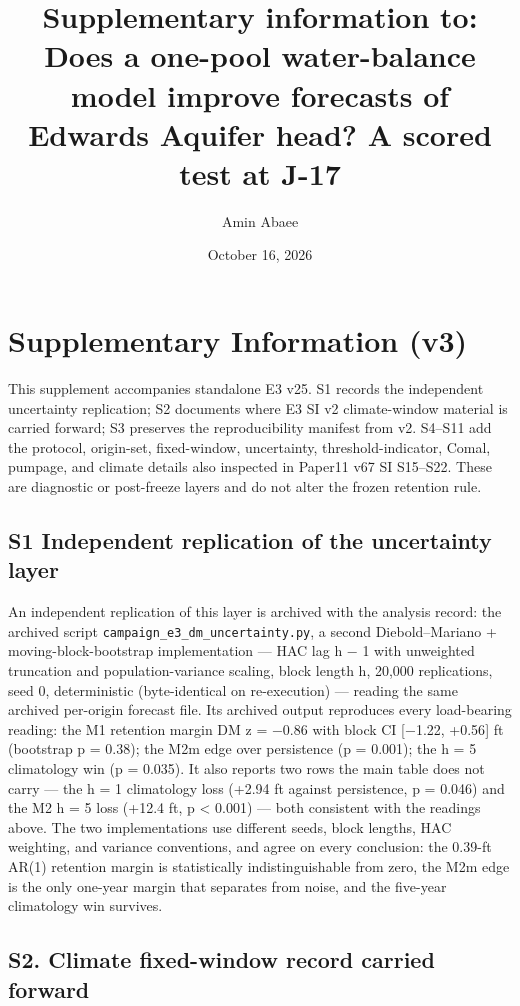 \documentclass[11pt]{article}
\title{Supplementary information to: Does a one-pool water-balance model improve forecasts of Edwards Aquifer head? A scored test at J-17}
\author{Amin Abaee}
\date{October 16, 2026}
\begin{document}
\maketitle

\section*{Supplementary Information (v3)}

This supplement accompanies standalone E3 v25. S1 records the independent uncertainty replication; S2 documents where E3 SI v2 climate-window material is carried forward; S3 preserves the reproducibility manifest from v2. S4--S11 add the protocol, origin-set, fixed-window, uncertainty, threshold-indicator, Comal, pumpage, and climate details also inspected in Paper11 v67 SI S15--S22. These are diagnostic or post-freeze layers and do not alter the frozen retention rule.

\subsection{S1 Independent replication of the uncertainty
layer}\label{s1-independent-replication-of-the-uncertainty-layer}

An independent replication of this layer is archived with the
analysis record: the archived script
\texttt{campaign\_e3\_dm\_uncertainty.py}, a second Diebold--Mariano +
moving-block-bootstrap implementation --- HAC lag h − 1 with unweighted
truncation and population-variance scaling, block length h, 20,000
replications, seed 0, deterministic (byte-identical on re-execution) ---
reading the same archived per-origin forecast file. Its archived
output reproduces every load-bearing reading:
the M1 retention margin DM z = −0.86 with block CI {[}−1.22, +0.56{]} ft
(bootstrap p = 0.38); the M2m edge over persistence (p = 0.001); the h =
5 climatology win (p = 0.035). It also reports two rows the main table
does not carry --- the h = 1 climatology loss (+2.94 ft against
persistence, p = 0.046) and the M2 h = 5 loss (+12.4 ft, p \textless{}
0.001) --- both consistent with the readings above. The two
implementations use different seeds, block lengths, HAC weighting, and
variance conventions, and agree on every conclusion: the 0.39-ft AR(1)
retention margin is statistically indistinguishable from zero, the M2m
edge is the only one-year margin that separates from noise, and the
five-year climatology win survives.


\subsection{S2. Climate fixed-window record carried forward}
\end{document}
